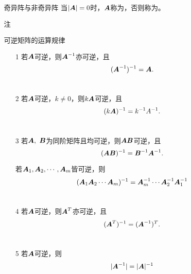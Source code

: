 \begin{frame}
  \begin{footnotesize}
    \begin{block}{奇异阵与非奇异阵}
      当$|\boldsymbol{A}|=0$时，$\boldsymbol{A}$称为，否则称为。
    \end{block}

    \pause
    \begin{block}{注}
    \end{block}
  \end{footnotesize}
\end{frame}



\begin{frame}
  \begin{footnotesize}
    \begin{block}{可逆矩阵的运算规律}
      \begin{itemize}
      \item[1] 若$\boldsymbol{A}$可逆，则$\boldsymbol{A}^{-1}$亦可逆，且
        $$(\boldsymbol{A}^{-1})^{-1}=\boldsymbol{A}.$$\\
      \item[2] 若$\boldsymbol{A}$可逆，$k\ne 0$，则$k\boldsymbol{A}$可逆，且
        $$(k\boldsymbol{A})^{-1}= k^{-1}A^{-1}.$$ \\
      \item[3] 若$\boldsymbol{A}, ~\boldsymbol{B}$为同阶矩阵且均可逆，则$\boldsymbol{A}\boldsymbol{B}$可逆，且
        $$(\boldsymbol{A}\boldsymbol{B})^{-1} = \boldsymbol{B}^{-1}\boldsymbol{A}^{-1}.$$ 
      \item[] 若$\boldsymbol{A}_1,\boldsymbol{A}_2,\cdots,\boldsymbol{A}_m$皆可逆，则
        $$
        (\boldsymbol{A}_1\boldsymbol{A}_2\cdots\boldsymbol{A}_m)^{-1}=\boldsymbol{A}_m^{-1}\cdots\boldsymbol{A}_2^{-1}\boldsymbol{A}_1^{-1}
        $$\\[0.3cm]
      \item[4] 若$\boldsymbol{A}$可逆，则$\boldsymbol{A}^T$亦可逆，且
        $$(\boldsymbol{A}^T)^{-1}=(\boldsymbol{A}^{-1})^T.$$ \\
      \item[5] 若$\boldsymbol{A}$可逆，则
        $$|\boldsymbol{A}^{-1}|=|\boldsymbol{A}|^{-1}$$
      \end{itemize}
    \end{block}
  \end{footnotesize}
\end{frame}


